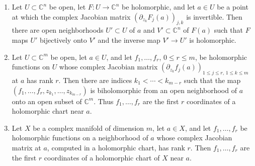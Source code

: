 \begin{proposition}\label{prop:holomorphic-inverse-function}
\begin{enumerate}
\item Let $U\subset\mathbb C^n$ be open, let $F\colon U\to\mathbb C^n$ be holomorphic, and let $a\in U$ be a point at which the complex Jacobian matrix $(\partial_{z_k}F_j(a))_{j,k}$ is invertible. Then there are open neighborhoods $U'\subset U$ of $a$ and $V'\subset\mathbb C^n$ of $F(a)$ such that $F$ maps $U'$ bijectively onto $V'$ and the inverse map $V'\to U'$ is holomorphic.
\item Let $U\subset\mathbb C^m$ be open, let $a\in U$, and let $f_1,\ldots,f_r$, $0\le r\le m$, be holomorphic functions on $U$ whose complex Jacobian matrix $(\partial_{z_k}f_j(a))_{1\le j\le r,\,1\le k\le m}$ at $a$ has rank $r$. Then there are indices $k_1<\cdots<k_{m-r}$ such that the map $(f_1,\ldots,f_r,z_{k_1},\ldots,z_{k_{m-r}})$ is biholomorphic from an open neighborhood of $a$ onto an open subset of $\mathbb C^m$. Thus $f_1,\ldots,f_r$ are the first $r$ coordinates of a holomorphic chart near $a$.
\item Let $X$ be a complex manifold of dimension $m$, let $a\in X$, and let $f_1,\ldots,f_r$ be holomorphic functions on a neighborhood of $a$ whose complex Jacobian matrix at $a$, computed in a holomorphic chart, has rank $r$. Then $f_1,\ldots,f_r$ are the first $r$ coordinates of a holomorphic chart of $X$ near $a$.
\end{enumerate}
\end{proposition}
